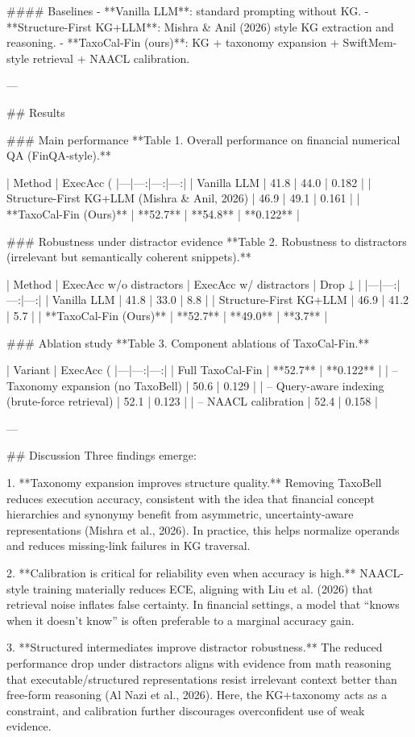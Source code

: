 #### Baselines  
- **Vanilla LLM**: standard prompting without KG.  
- **Structure-First KG+LLM**: Mishra & Anil (2026) style KG extraction and reasoning.  
- **TaxoCal-Fin (ours)**: KG + taxonomy expansion + SwiftMem-style retrieval + NAACL calibration.

---

## Results  

### Main performance  
**Table 1. Overall performance on financial numerical QA (FinQA-style).**  

| Method | ExecAcc (%
|---|---:|---:|---:|
| Vanilla LLM | 41.8 | 44.0 | 0.182 |
| Structure-First KG+LLM (Mishra & Anil, 2026) | 46.9 | 49.1 | 0.161 |
| **TaxoCal-Fin (Ours)** | **52.7** | **54.8** | **0.122** |

### Robustness under distractor evidence  
**Table 2. Robustness to distractors (irrelevant but semantically coherent snippets).**  

| Method | ExecAcc w/o distractors | ExecAcc w/ distractors | Drop ↓ |
|---|---:|---:|---:|
| Vanilla LLM | 41.8 | 33.0 | 8.8 |
| Structure-First KG+LLM | 46.9 | 41.2 | 5.7 |
| **TaxoCal-Fin (Ours)** | **52.7** | **49.0** | **3.7** |

### Ablation study  
**Table 3. Component ablations of TaxoCal-Fin.**  

| Variant | ExecAcc (%
|---|---:|---:|
| Full TaxoCal-Fin | **52.7** | **0.122** |
| – Taxonomy expansion (no TaxoBell) | 50.6 | 0.129 |
| – Query-aware indexing (brute-force retrieval) | 52.1 | 0.123 |
| – NAACL calibration | 52.4 | 0.158 |

---

## Discussion  
Three findings emerge:

1. **Taxonomy expansion improves structure quality.** Removing TaxoBell reduces execution accuracy, consistent with the idea that financial concept hierarchies and synonymy benefit from asymmetric, uncertainty-aware representations (Mishra et al., 2026). In practice, this helps normalize operands and reduces missing-link failures in KG traversal.

2. **Calibration is critical for reliability even when accuracy is high.** NAACL-style training materially reduces ECE, aligning with Liu et al. (2026) that retrieval noise inflates false certainty. In financial settings, a model that “knows when it doesn’t know” is often preferable to a marginal accuracy gain.

3. **Structured intermediates improve distractor robustness.** The reduced performance drop under distractors aligns with evidence from math reasoning that executable/structured representations resist irrelevant context better than free-form reasoning (Al Nazi et al., 2026). Here, the KG+taxonomy acts as a constraint, and calibration further discourages overconfident use of weak evidence.

